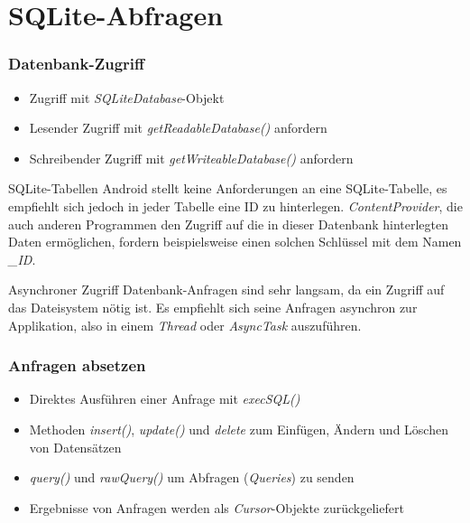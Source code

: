 \section{SQLite-Abfragen}
\begin{frame}
   \frametitle{Datenbank-Zugriff}
   \begin{itemize}
   	\item Zugriff mit \emph{SQLiteDatabase}-Objekt 
   	\item Lesender Zugriff mit \emph{getReadableDatabase()} anfordern
   	\item Schreibender Zugriff mit \emph{getWriteableDatabase()} anfordern
   \end{itemize}

	\begin{alertblock}{SQLite-Tabellen}
		Android stellt keine Anforderungen an eine SQLite-Tabelle, 
		es empfiehlt sich jedoch in jeder Tabelle eine ID zu hinterlegen. 
		\emph{ContentProvider}, die auch anderen Programmen den Zugriff auf die in 
		dieser Datenbank hinterlegten Daten ermöglichen, fordern beispielsweise 
		einen solchen Schlüssel mit dem Namen \emph{\_ID}.
	\end{alertblock}
	
	\begin{alertblock}{Asynchroner Zugriff}
		Datenbank-Anfragen sind sehr langsam, da ein Zugriff auf das Dateisystem 
		nötig ist. Es empfiehlt sich seine Anfragen asynchron zur Applikation, 
		also in einem \emph{Thread} oder \emph{AsyncTask} auszuführen.
	\end{alertblock}  
\end{frame}

\begin{frame}
   \frametitle{Anfragen absetzen}
   \begin{itemize}
   	\item Direktes Ausführen einer Anfrage mit \emph{execSQL()}
   	\item Methoden \emph{insert()}, \emph{update()} und \emph{delete} 
   		zum Einfügen, Ändern und Löschen von Datensätzen
   	\item \emph{query()} und \emph{rawQuery()} um Abfragen (\emph{Queries}) 
			zu senden
   	\item Ergebnisse von Anfragen werden als \emph{Cursor}-Objekte zurückgeliefert
   \end{itemize}
\end{frame}

